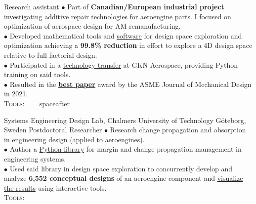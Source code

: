 \documentclass[10pt]{article} %
\begin{document}
{} %
{} %
{} %
{Research assistant} %
{
	$\bullet$ Part of \textbf{Canadian/European industrial project} investigating additive repair technologies for aeroengine parts. I focused on optimization of aerospace design for AM remanufacturing.\\
	$\bullet$ Developed mathematical tools and \href{https://github.com/khbalhandawi/scale_AM_webapp}{software} for design space exploration and optimization achieving a \textbf{99.8\% reduction} in effort to explore a 4D design space relative to full factorial design.\\
	$\bullet$ Participated in a \href{https://www.chalmers.se/en/departments/ims/news/Pages/Optimizationdriven-setbased-design-.aspx}{technology transfer} at GKN Aerospace, providing Python training on said tools.\\
	$\bullet$ Resulted in the \textbf{\href{https://www.gknaerospace.com/en/our-technology/2022/additive-manufacturing-research-paper-receives-journal-of-mechanical-design-award/}{best paper}} award by the ASME Journal of Mechanical Design in 2021.\\
	\textsc{Tools:} ~~~
}
{spaceafter}  %


{} %
{Systems Engineering Design Lab, Chalmers University of Technology} %
{G\"{o}teborg, Sweden} %
{Postdoctoral Researcher} %
{
	$\bullet$ Research change propagation and absorption in engineering design (applied to aeroengines).\\
	$\bullet$ Author a \href{https://sed-group.github.io/mvmlib/index.html}{Python library} for margin and change propagation management in engineering systems.\\
	$\bullet$ Used said library in design space exploration to concurrently develop and analyze \textbf{6,552 conceptual designs} of an aeroengine component and \href{https://khbalhandawi.github.io/projects/1_project/}{visualize the results} using interactive tools.\\
	\textsc{Tools:} ~
}
{} %
\end{document}
